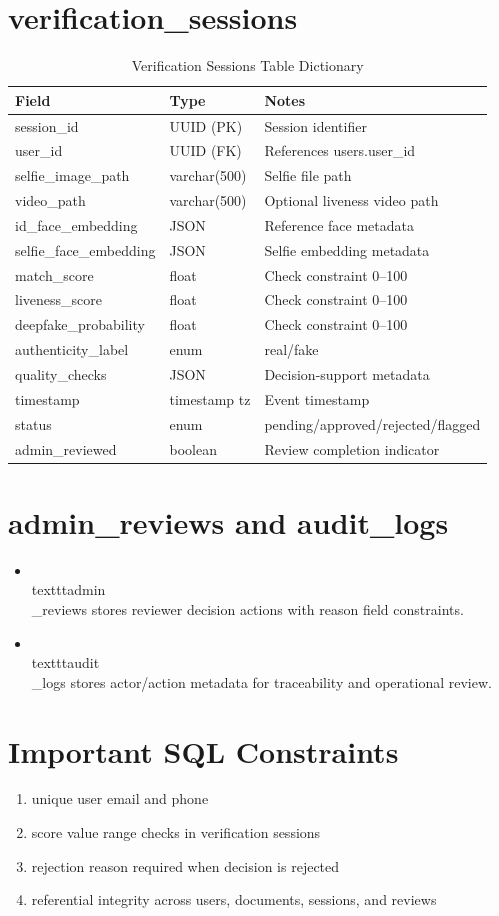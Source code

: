 \section{verification\_sessions}
\begin{longtable}{p{3.4cm}p{3.0cm}p{7.0cm}}
\caption{Verification Sessions Table Dictionary}\\
\toprule
Field & Type & Notes \\
\midrule
session\_id & UUID (PK) & Session identifier \\
user\_id & UUID (FK) & References users.user\_id \\
selfie\_image\_path & varchar(500) & Selfie file path \\
video\_path & varchar(500) & Optional liveness video path \\
id\_face\_embedding & JSON & Reference face metadata \\
selfie\_face\_embedding & JSON & Selfie embedding metadata \\
match\_score & float & Check constraint 0--100 \\
liveness\_score & float & Check constraint 0--100 \\
deepfake\_probability & float & Check constraint 0--100 \\
authenticity\_label & enum & real/fake \\
quality\_checks & JSON & Decision-support metadata \\
timestamp & timestamp tz & Event timestamp \\
status & enum & pending/approved/rejected/flagged \\
admin\_reviewed & boolean & Review completion indicator \\
\bottomrule
\end{longtable}

\section{admin\_reviews and audit\_logs}
\begin{itemize}
\item \\texttt{admin\\_reviews} stores reviewer decision actions with reason field constraints.
\item \\texttt{audit\\_logs} stores actor/action metadata for traceability and operational review.
\end{itemize}

\section{Important SQL Constraints}
\begin{enumerate}
\item unique user email and phone
\item score value range checks in verification sessions
\item rejection reason required when decision is rejected
\item referential integrity across users, documents, sessions, and reviews
\end{enumerate}
